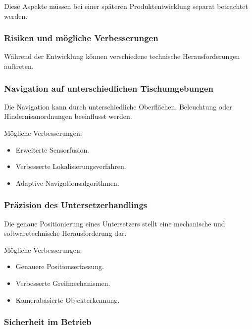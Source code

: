 Diese Aspekte müssen bei einer späteren Produktentwicklung separat
betrachtet werden.

\subsubsection{Risiken und mögliche
Verbesserungen}\label{risiken-und-muxf6gliche-verbesserungen}

Während der Entwicklung können verschiedene technische Herausforderungen
auftreten.

\subsubsection{Navigation auf unterschiedlichen
Tischumgebungen}\label{navigation-auf-unterschiedlichen-tischumgebungen}

Die Navigation kann durch unterschiedliche Oberflächen, Beleuchtung oder
Hindernisanordnungen beeinflusst werden.

Mögliche Verbesserungen:

\begin{itemize}
\tightlist
\item
  Erweiterte Sensorfusion.
\item
  Verbesserte Lokalisierungsverfahren.
\item
  Adaptive Navigationsalgorithmen.
\end{itemize}

\subsubsection{Präzision des
Untersetzerhandlings}\label{pruxe4zision-des-untersetzerhandlings}

Die genaue Positionierung eines Untersetzers stellt eine mechanische und
softwaretechnische Herausforderung dar.

Mögliche Verbesserungen:

\begin{itemize}
\tightlist
\item
  Genauere Positionserfassung.
\item
  Verbesserte Greifmechanismen.
\item
  Kamerabasierte Objekterkennung.
\end{itemize}

\subsubsection{Sicherheit im Betrieb}\label{sicherheit-im-betrieb}

